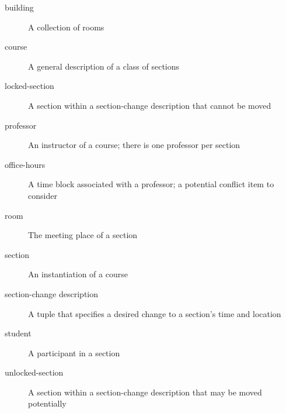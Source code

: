 \begin{description}
  \item[building] A collection of rooms
  \item[course] A general description of a class of sections
  \item[locked-section] A section within a section-change description that cannot be moved
  \item[professor] An instructor of a course; there is one professor per section
  \item[office-hours] A time block associated with a professor; a potential conflict item to consider
  \item[room] The meeting place of a section
  \item[section] An instantiation of a course
  \item[section-change description] A tuple that specifies a desired change to a section's time and location
  \item[student] A participant in a section
  \item[unlocked-section] A section within a section-change description that may be moved potentially
\end{description}
